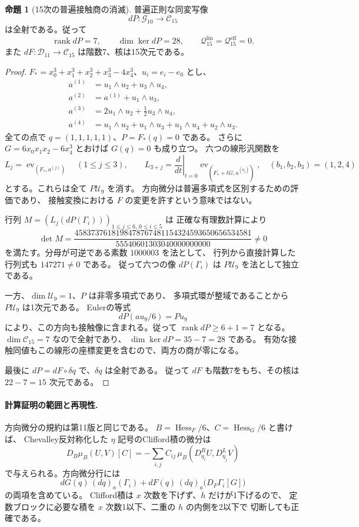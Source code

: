 \documentclass[a4paper,11pt]{ltjsarticle}
\theoremstyle{definition}
\newtheorem{proposition}[theorem]{命題}
\begin{document}
\begin{proposition}[15次の普遍接触商の消滅]
\label{prop:v12-contact-rank-fifteenth}
普遍正則な同変写像
\[
 dP:\mathcal G_{10}\longrightarrow\mathcal C_{15}
\]
は全射である。従って
\[
 \operatorname{rank}dP=7,\qquad \dim\ker dP=28,
 \qquad\mathcal Q^{\mathrm{lin}}_{15}
       =\mathcal Q^{\mathrm{eff}}_{15}=0.
\]
また $dF:\mathcal D_{11}\to\mathcal C_{15}$ は階数7、核は15次元である。
\end{proposition}
\begin{proof}
$F_*=x_0^3+x_1^3+x_2^3+x_3^3-4x_4^3$、$u_i=e_i-e_0$ とし、
\begin{align*}
 a^{(1)}&=u_1\wedge u_2+u_3\wedge u_4,\\
 a^{(2)}&=a^{(1)}+u_1\wedge u_3,\\
 a^{(3)}&=2u_1\wedge u_2+\tfrac12u_3\wedge u_4,\\
 a^{(4)}&=u_1\wedge u_2+u_1\wedge u_3
                    +u_1\wedge u_4+u_2\wedge u_3.
\end{align*}
全ての点で $q=(1,1,1,1,1)$、$P=F_*(q)=0$ である。
さらに $G=6x_0x_1x_2-6x_4^3$ とおけば $G(q)=0$ も成り立つ。
六つの線形汎関数を
\[
 L_j=\operatorname{ev}_{(F_*,a^{(j)})}\quad(1\le j\le3),
 \qquad
 L_{3+j}=\left.\frac{d}{dt}\right|_{t=0}
       \operatorname{ev}_{(F_*+tG,a^{(b_j)})},
 \quad (b_1,b_2,b_3)=(1,2,4)
\]
とする。これらは全て $P\mathcal U_9$ を消す。
方向微分は普遍多項式を区別するための評価であり、
接触変換における $F$ の変更を許すという意味ではない。

行列 $M=(L_j(dP(\Gamma_i)))_{1\le j\le6,\,0\le i\le5}$ は
正確な有理数計算により
\[
 \det M=
 \frac{4583737618198478767481154324593650656534581}
      {55540601303040000000000}\ne0
\]
を満たす。分母が可逆である素数 $1000003$ を法として、
行列から直接計算した行列式も $147271\ne0$ である。
従って六つの像 $dP(\Gamma_i)$ は $P\mathcal U_9$ を法として独立である。

一方、$\dim\mathcal U_9=1$、$P$ は非零多項式であり、
多項式環が整域であることから $P\mathcal U_9$ は1次元である。
Eulerの等式
\[
 dP(au_9/6)=Pu_9
\]
により、この方向も接触像に含まれる。従って
$\operatorname{rank}dP\ge6+1=7$ となる。
$\dim\mathcal C_{15}=7$ なので全射であり、
$\dim\ker dP=35-7=28$ である。
有効な接触同値もこの線形の座標変更を含むので、両方の商が零になる。

最後に $dP=dF\circ\delta q$ で、$\delta q$ は全射である。
従って $dF$ も階数7をもち、その核は $22-7=15$ 次元である。
\end{proof}

\paragraph{計算証明の範囲と再現性.}
方向微分の規約は第11版と同じである。
$B=\operatorname{Hess}_F/6$、$C=\operatorname{Hess}_G/6$ と書けば、
Chevalley反対称化した $\eta$ 記号のClifford積の微分は
\[
 D_B\mu_B(U,V)[C]
 =-\sum_{i,j}C_{ij}\,
       \mu_B(D^R_{\eta_i}U,D^L_{\eta_j}V)
\]
で与えられる。方向微分行には
\[
 dG(q)\,(dq)_a(\Gamma_i)
 +dF(q)\,(dq)_a\bigl(D_F\Gamma_i[G]\bigr)
\]
の両項を含めている。
Clifford積は $x$ 次数を下げず、$h$ だけが1下げるので、
定数ブロックに必要な積を $x$ 次数1以下、二重の $h$ の内側を2以下で
切断しても正確である。
\end{document}
